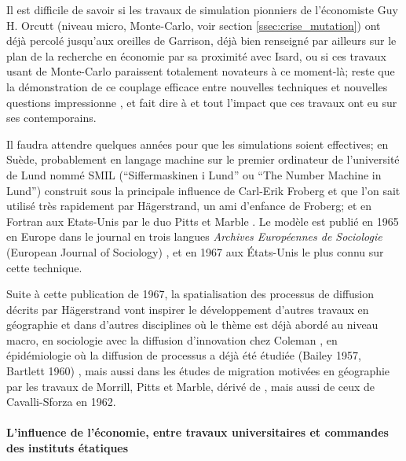 Il est difficile de savoir si les travaux de simulation pionniers de l'économiste Guy H. Orcutt \autocites{Orcutt1957, Orcutt1960} (niveau micro, Monte-Carlo, voir section \ref{ssec:crise_mutation}) ont déjà percolé jusqu'aux oreilles de Garrison, déjà bien renseigné par ailleurs sur le plan de la recherche en économie par sa proximité avec Isard, ou si ces travaux usant de Monte-Carlo paraissent totalement novateurs à ce moment-là; reste que la démonstration de ce couplage efficace entre nouvelles techniques et nouvelles questions impressionne \autocite[120]{Unwin1992}, et fait dire à \textcite{Morril2005} et \textcite{Gould1970} tout l'impact que ces travaux ont eu sur ses contemporains.

Il faudra attendre quelques années pour que les simulations soient effectives; en Suède, probablement en langage machine sur le premier ordinateur de l'université de Lund nommé SMIL (\foreignquote{sweden}{Siffermaskinen i Lund} ou \foreignquote{english}{The Number Machine in Lund}) construit sous la principale influence de Carl-Erik Froberg et que l'on sait utilisé très rapidement par Hägerstrand, un ami d'enfance de Froberg; et en Fortran aux Etats-Unis par le duo Pitts et Marble \autocites{Morril2005, Marble1972, Pitts1963}. Le modèle est publié en 1965 en Europe dans le journal en trois langues \textit{Archives Européennes de Sociologie} (European Journal of Sociology) \autocite{Hagerstrand1965}, et en 1967 \autocite{Hagerstrand1967a} aux États-Unis le plus connu sur cette technique.


Suite à cette publication de 1967, la spatialisation des processus de diffusion décrits par Hägerstrand vont inspirer le développement d'autres travaux en géographie et dans d'autres disciplines où le thème est déjà abordé au niveau macro, en sociologie avec la diffusion d'innovation chez Coleman \autocite{Coleman1957}, en épidémiologie \autocite{Cliff1981} où la diffusion de processus a déjà été étudiée (Bailey 1957, Bartlett 1960) \autocite{Pitts1963, Morrill1968}, mais aussi dans les études de migration motivées en géographie par les travaux de Morrill, Pitts et Marble, dérivé de \autocite{Wolpert1965}, mais aussi de ceux de Cavalli-Sforza en 1962.

\paragraph{L'influence de l'économie, entre travaux universitaires et commandes des instituts étatiques}

